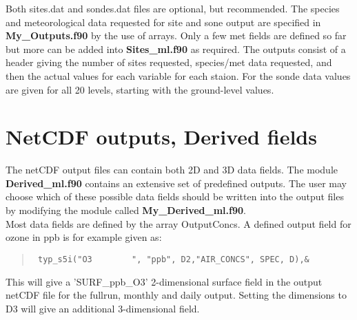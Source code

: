 Both sites.dat and sondes.dat files are optional, but recommended. 
The species and meteorological data requested for site and sone output
 are specified in {\bf My\_Outputs.f90} by the use of arrays. Only a 
few met fields are defined so far but more can be added into 
{\bf Sites\_ml.f90} as required. The outputs consist
of a header giving the number of sites requested, species/met data requested, and
then the actual values for each variable for each staion. For the sonde data
values are given for all 20 levels, starting with the ground-level values.




\section{NetCDF outputs, Derived fields}


% 

The netCDF output files can contain both 2D and 3D data fields. The module 
{ \bf Derived\_ml.f90 } contains an extensive set of predefined outputs. 
The user may choose which of these possible data fields should be written 
into the output files by modifying the module called { \bf My\_Derived\_ml.f90}.\\

Most data fields are defined by the array OutputConcs. A defined output 
field for ozone in ppb is for example given  as:
\begin{quote}
\begin{verbatim}
 typ_s5i("O3        ", "ppb", D2,"AIR_CONCS", SPEC, D),& 
\end{verbatim}
\end{quote}
This will give a 'SURF\_ppb\_O3' 2-dimensional surface field in the output netCDF file for 
the fullrun, monthly and daily output. 
Setting the dimensions to D3 will give an additional 3-dimensional field. 


